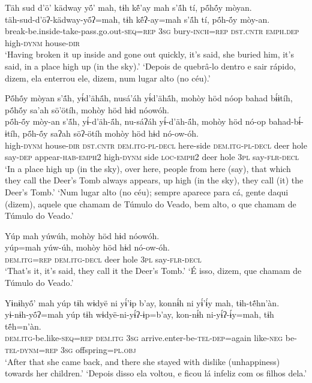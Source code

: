 \documentclass[output=paper,
modfonts,nonflat
]{langsci/langscibook}
\begin{document}
\newpage
\ea  Täh sud d’ö’ kädway yö́’ mah, tɨh kẽ́’ay mah s’ã́h tí, pö́hö́y mòyan.\\
\gll täh-sud-d’öʔ-kädway-yö́ʔ=mah, tɨh kẽ́ʔ-ay=mah s’ã́h tí, pö́h-ö́y mòy-an.\\
     break-be.inside-take-pass.go.out\textsc{-seq=rep} \textsc{3sg} bury\textsc{-inch=rep} \textsc{dst.cntr} \textsc{emph.dep} high\textsc{-dynm} house\textsc{-dir}\\
\glt ‘Having broken it up inside and gone out quickly, it’s said, she buried him, it’s said, in a place high up (in the sky).'
\glt ‘Depois de quebrâ-lo dentro e sair rápido, dizem, ela enterrou ele, dizem, num lugar alto (no céu).'
\z 

\ea  Pö́hö́y mòyan s’ã́h, yɨ́d’ähä́h, nusá’áh yɨ́d’ähä́h, mohòy höd nóop bahad bɨ́ɨtíh, pö́hö́y sa’ah sö’ötíh, mohòy höd hɨd nóowóh.\\
\gll pö́h-ö́y mòy-an s’ã́h, yɨ́-d’äh-ä́h, nu-sáʔáh yɨ́-d’äh-ä́h, mohòy höd nó-op bahad-bɨ́-ɨtíh, pö́h-ö́y saʔah söʔ-ötíh mohòy höd hɨd nó-ow-óh.\\
     high\textsc{-dynm} house\textsc{-dir} \textsc{dst.cntr} \textsc{dem.itg-pl-decl} here-side \textsc{dem.itg-pl-decl}  deer hole say\textsc{-dep} appear\textsc{-hab-emph2} high\textsc{-dynm} side \textsc{loc-emph2} deer hole \textsc{3pl} say\textsc{-flr-decl}\\
\glt ‘In a place high up (in the sky), over here, people from here (say), that which they call the Deer’s Tomb always appears, up high (in the sky), they call (it) the Deer’s Tomb.'{\footnotemark}
\glt ‘Num lugar alto (no céu); sempre aparece para cá, gente daqui (dizem), aquele que chamam de Túmulo do Veado, bem alto, o que chamam de Túmulo do Veado.'
\z 

\ea Yúp mah yúwúh, mohòy höd hɨd nóowóh.\\
\gll yúp=mah yúw-úh, mohòy höd hɨd nó-ow-óh.\\
	\textsc{dem.itg=rep} \textsc{dem.itg-decl} deer hole \textsc{3pl} say\textsc{-flr-decl}\\
\glt ‘That’s it, it’s said, they call it the Deer’s Tomb.'
\glt ‘É isso, dizem, que chamam de Túmulo do Veado.'
\z

\newpage
\ea  Yɨnɨhyö́’ mah yúp tɨh wɨdyë ni yɨ́’ɨp b’ay, konnɨ́h ni yɨ́’ɨ́y mah, tɨh-tẽ́hn’àn.\\
\gll yɨ-nɨh-yö́ʔ=mah yúp tɨh wɨdyë-ni-yɨ́ʔ-ɨp=b’ay, kon-nɨ́h ni-yɨ́ʔ-ɨ́y=mah, tɨh tẽ́h=n’àn.\\
     \textsc{dem.itg-}be.like\textsc{-seq=rep} \textsc{dem.itg} \textsc{3sg} arrive.enter-be\textsc{-tel-dep}=again like\textsc{-neg} be\textsc{-tel-dynm=rep} \textsc{3sg} offspring\textsc{=pl.obj}\\
\glt ‘After that she came back, and there she stayed with dislike (unhappiness) towards her children.'
\glt ‘Depois disso ela voltou, e ficou lá infeliz com os filhos dela.'
\z 
\end{document}
